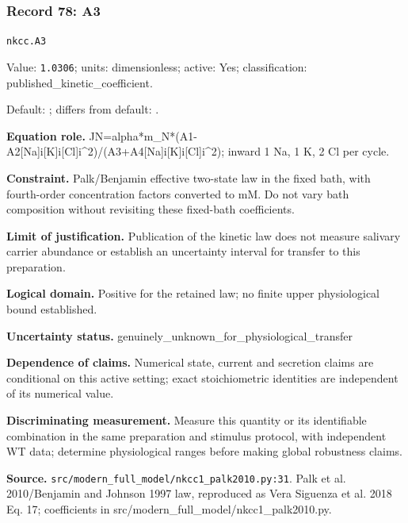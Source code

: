 \subsubsection*{Record 78: A3}
{\small \nolinkurl{nkcc.A3}\par

Value: \texttt{1.0306}; units: dimensionless; active: Yes; classification: published\_kinetic\_coefficient.\par

Default: ; differs from default: .\par

\textbf{Equation role.} JN=alpha*m\_N*(A1-A2[Na]i[K]i[Cl]i\textasciicircum{}2)/(A3+A4[Na]i[K]i[Cl]i\textasciicircum{}2); inward 1 Na, 1 K, 2 Cl per cycle.\par

\textbf{Constraint.} Palk/Benjamin effective two-state law in the fixed bath, with fourth-order concentration factors converted to mM. Do not vary bath composition without revisiting these fixed-bath coefficients.\par

\textbf{Limit of justification.} Publication of the kinetic law does not measure salivary carrier abundance or establish an uncertainty interval for transfer to this preparation.\par

\textbf{Logical domain.} Positive for the retained law; no finite upper physiological bound established.\par

\textbf{Uncertainty status.} genuinely\_unknown\_for\_physiological\_transfer\par

\textbf{Dependence of claims.} Numerical state, current and secretion claims are conditional on this active setting; exact stoichiometric identities are independent of its numerical value.\par

\textbf{Discriminating measurement.} Measure this quantity or its identifiable combination in the same preparation and stimulus protocol, with independent WT data; determine physiological ranges before making global robustness claims.\par

\textbf{Source.} \nolinkurl{src/modern_full_model/nkcc1_palk2010.py:31}. Palk et al. 2010/Benjamin and Johnson 1997 law, reproduced as Vera Siguenza et al. 2018 Eq. 17; coefficients in src/modern\_full\_model/nkcc1\_palk2010.py.\par}

